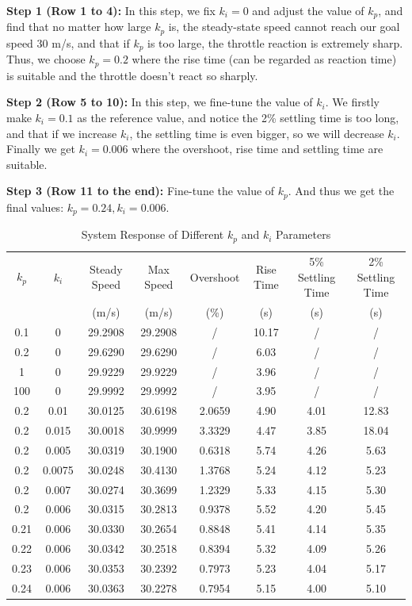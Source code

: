 \documentclass[12pt]{article}
\begin{document}
\textbf{Step 1 (Row 1 to 4):} In this step, we fix $k_i = 0$ and adjust the value of $k_p$, and find that no matter how large $k_p$ is, the steady-state speed cannot reach our goal speed 30 m/s, and that if $k_p$ is too large, the throttle reaction is extremely sharp. Thus, we choose $k_p=0.2$ where the rise time (can be regarded as reaction time) is suitable and the throttle doesn't react so sharply.

\textbf{Step 2 (Row 5 to 10):} In this step, we fine-tune the value of $k_i$. We firstly make $k_i=0.1$ as the reference value, and notice the 2\% settling time is too long, and that if we increase $k_i$, the settling time is even bigger, so we will decrease $k_i$. Finally we get $k_i=0.006$ where the overshoot, rise time and settling time are suitable.

\textbf{Step 3 (Row 11 to the end):} Fine-tune the value of $k_p$. And thus we get the final values: $k_p=0.24, k_i=0.006$.

\begin{table}[htbp]
    \centering
    \begin{tabular}{cccccccc}
    \hline
       $k_p$ & $k_i$ & Steady Speed & Max Speed & Overshoot & Rise Time & 5\% Settling Time & 2\% Settling Time \\
        &  & (m/s) & (m/s) & (\%) & (s) & (s) & (s) \\
    \hline
        0.1 & 0 & 29.2908 & 29.2908 & / & 10.17 & / & / \\
        0.2 & 0 & 29.6290 & 29.6290 & / & 6.03 & / & / \\
        1 & 0 & 29.9229 & 29.9229 & / & 3.96 & / & / \\
        100 & 0 & 29.9992 & 29.9992 & / & 3.95 & / & / \\
        0.2 & 0.01 & 30.0125 & 30.6198 & 2.0659 & 4.90 & 4.01 & 12.83 \\
        0.2 & 0.015 & 30.0018 & 30.9999 & 3.3329 & 4.47 & 3.85 & 18.04 \\
        0.2 & 0.005 & 30.0319 & 30.1900 & 0.6318 & 5.74 & 4.26 & 5.63 \\
        0.2 & 0.0075 & 30.0248 & 30.4130 & 1.3768 & 5.24 & 4.12 & 5.23 \\
        0.2 & 0.007 & 30.0274 & 30.3699 & 1.2329 & 5.33 & 4.15 & 5.30 \\
        0.2 & 0.006 & 30.0315 & 30.2813 & 0.9378 & 5.52 & 4.20 & 5.45 \\
        0.21 & 0.006 & 30.0330 & 30.2654 & 0.8848 & 5.41 & 4.14 & 5.35 \\
        0.22 & 0.006 & 30.0342 & 30.2518 & 0.8394 & 5.32 & 4.09 & 5.26 \\
        0.23 & 0.006 & 30.0353 & 30.2392 & 0.7973 & 5.23 & 4.04 & 5.17 \\
        0.24 & 0.006 & 30.0363 & 30.2278 & 0.7954 & 5.15 & 4.00 & 5.10 \\
    \hline
    \end{tabular}
    \caption{System Response of Different $k_p$ and $k_i$ Parameters}
    \label{tab:pid}
\end{table}
\end{document}
